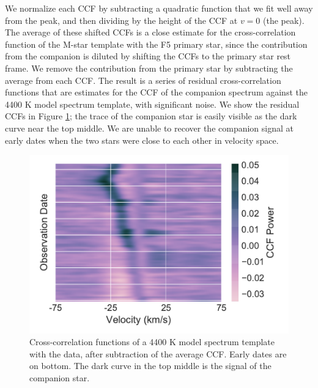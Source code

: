 \documentclass[twocolumn]{emulateapj}
\begin{document}
We normalize each CCF by subtracting a quadratic function that we fit well away from the peak, and then dividing by the height of the CCF at $v=0$ (the peak). The average of these shifted CCFs is a close estimate for the cross-correlation function of the M-star template with the F5 primary star, since the contribution from the companion is diluted by shifting the CCFs to the primary star rest frame. We remove the contribution from the primary star by subtracting the average from each CCF. The result is a series of residual cross-correlation functions that are estimates for the CCF of the companion spectrum against the 4400 K model spectrum template, with significant noise. We show the residual CCFs in Figure \ref{fig:resids}; the trace of the companion star is easily visible as the dark curve near the top middle. We are unable to recover the companion signal at early dates when the two stars were close to each other in velocity space.



\begin{figure}
  \centering
  \includegraphics[width=\columnwidth]{Resid_CCFs.pdf}
  \caption{Cross-correlation functions of a 4400 K model spectrum template with the data, after subtraction of the average CCF. Early dates are on bottom. The dark curve in the top middle is the signal of the companion star.}
  \label{fig:resids}
\end{figure}
\end{document}
